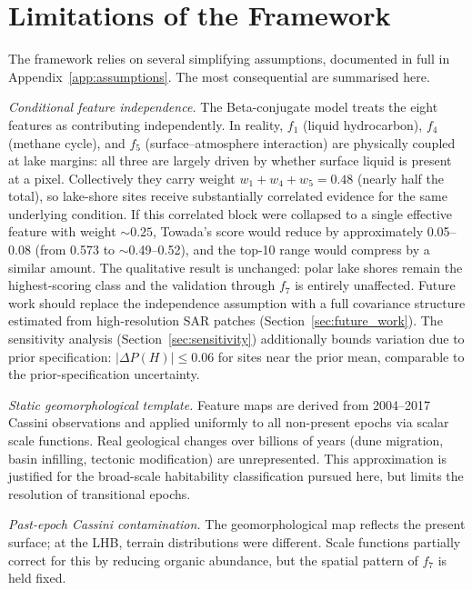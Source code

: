 \section{Limitations of the Framework}
\label{sec:limitations}

The framework relies on several simplifying assumptions, documented in full in Appendix~\ref{app:assumptions}.  The most consequential are summarised here.

\label{sec:independence}
\textit{Conditional feature independence.}  The Beta-conjugate model treats the eight features as contributing independently.  In reality, $f_1$ (liquid hydrocarbon), $f_4$ (methane cycle), and $f_5$ (surface--atmosphere interaction) are physically coupled at lake margins: all three are largely driven by whether surface liquid is present at a pixel.  Collectively they carry weight $w_1 + w_4 + w_5 = 0.48$ (nearly half the total), so lake-shore sites receive substantially correlated evidence for the same underlying condition.  If this correlated block were collapsed to a single effective feature with weight ${\sim}0.25$, Towada's score would reduce by approximately 0.05--0.08 (from 0.573 to ${\sim}$0.49--0.52), and the top-10 range would compress by a similar amount.  The qualitative result is unchanged: polar lake shores remain the highest-scoring class and the \dragonfly{} validation through $f_7$ is entirely unaffected.  Future work should replace the independence assumption with a full covariance structure estimated from high-resolution SAR patches (Section~\ref{sec:future_work}).  The sensitivity analysis (Section~\ref{sec:sensitivity}) additionally bounds variation due to prior specification: $|\Delta P(H)| \leq 0.06$ for sites near the prior mean, comparable to the prior-specification uncertainty.

\textit{Static geomorphological template.}  Feature maps are derived from 2004--2017 Cassini observations and applied uniformly to all non-present epochs via scalar scale functions.  Real geological changes over billions of years (dune migration, basin infilling, tectonic modification) are unrepresented.  This approximation is justified for the broad-scale habitability classification pursued here, but limits the resolution of transitional epochs.

\label{sec:past_contamination}
\textit{Past-epoch Cassini contamination.}  The geomorphological map reflects the present surface; at the LHB, terrain distributions were different.  Scale functions partially correct for this by reducing organic abundance, but the spatial pattern of $f_7$ is held fixed.

